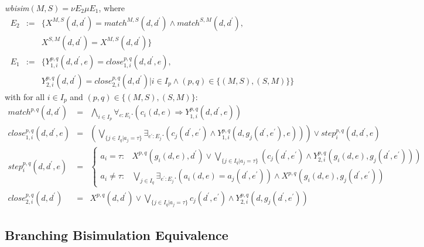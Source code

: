 \documentclass{article}
\begin{document}
\emph{wbisim}$(M,S)=\nu E_{2}\mu E_{1}$, where%
\[
\begin{array}{ccl}
E_{2} & := & \{X^{M,S}(d,d^{\prime })=match^{M,S}(d,d^{\prime })\wedge
match^{S,M}(d,d^{\prime }), \\
&  & X^{S,M}(d,d^{\prime })=X^{M,S}(d,d^{\prime })\} \\
E_{1} & := & \{Y_{1,i}^{p,q}(d,d^{\prime },e)=close_{1,i}^{p,q}(d,d^{\prime
},e), \\
&  & Y_{2,i}^{p,q}(d,d^{\prime })=close_{2,i}^{p,q}(d,d^{\prime })|i\in
I_{p}\wedge (p,q)\in \{(M,S),(S,M)\}\}%
\end{array}%
\]%
with for all $i\in I_{p}$ and $(p,q)\in \{(M,S),(S,M)\}$:%
\begin{eqnarray*}
match^{p,q}(d,d^{\prime }) &=&\bigwedge\limits_{i\in I_{p}}\forall
_{e:E_{i}}.(c_{i}(d,e)\Rightarrow Y_{1,i}^{p,q}(d,d^{\prime },e)) \\
close_{1,i}^{p,q}(d,d^{\prime },e) &=&\left( \bigvee\limits_{\{j\in
I_{q}|a_{j}=\tau \}}\exists _{e^{\prime }:E_{j}}.(c_{j}(d^{\prime
},e^{\prime })\wedge Y_{1,i}^{p,q}(d,g_{j}(d^{\prime },e^{\prime
}),e))\right) \vee step_{i}^{p,q}(d,d^{\prime },e) \\
step_{i}^{p,q}(d,d^{\prime },e) &=&\left\{
\begin{array}{cl}
a_{i}=\tau : & X^{p,q}(g_{i}(d,e),d^{\prime })\vee \bigvee\limits_{\{j\in
I_{q}|a_{j}=\tau \}}\left( c_{j}(d^{\prime },e^{\prime })\wedge
Y_{2,i}^{p,q}(g_{i}(d,e),g_{j}(d^{\prime },e^{\prime }))\right)  \\
a_{i}\neq \tau : & \bigvee\limits_{j\in I_{q}}\exists _{e^{\prime
}:E_{j}}.(a_{i}(d,e)=a_{j}(d^{\prime },e^{\prime }))\wedge
X^{p,q}(g_{i}(d,e),g_{j}(d^{\prime },e^{\prime }))%
\end{array}%
\right.  \\
close_{2,i}^{p,q}(d,d^{\prime }) &=&X^{p,q}(d,d^{\prime })\vee
\bigvee\limits_{\{j\in I_{q}|a_{j}=\tau \}}c_{j}(d^{\prime },e^{\prime
})\wedge Y_{2,i}^{p,q}(d,g_{j}(d^{\prime },e^{\prime }))
\end{eqnarray*}

\subsection{Branching Bisimulation Equivalence}
\end{document}
